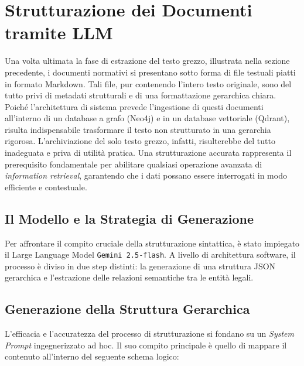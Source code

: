 \section{Strutturazione dei Documenti tramite LLM}
\label{sec:strutturazione_semantica}

Una volta ultimata la fase di estrazione del testo grezzo, illustrata nella sezione precedente, i documenti normativi si presentano sotto forma di file testuali piatti in formato Markdown. Tali file, pur contenendo l'intero testo originale, sono del tutto privi di metadati strutturali e di una formattazione gerarchica chiara. 
Poiché l'architettura di sistema prevede l'ingestione di questi documenti all'interno di un database a grafo (Neo4j) e in un database vettoriale (Qdrant), risulta indispensabile trasformare il testo non strutturato in una gerarchia rigorosa. L'archiviazione del solo testo grezzo, infatti, risulterebbe del tutto inadeguata e priva di utilità pratica. Una strutturazione accurata rappresenta il prerequisito fondamentale per abilitare qualsiasi operazione avanzata di \textit{information retrieval}, garantendo che i dati possano essere interrogati in modo efficiente e contestuale.

\subsection{Il Modello e la Strategia di Generazione}

Per affrontare il compito cruciale della strutturazione sintattica, è stato impiegato il Large Language Model \texttt{Gemini 2.5-flash}. A livello di architettura software, il processo è diviso in due step distinti: la generazione di una struttura JSON gerarchica e l'estrazione delle relazioni semantiche tra le entità legali.

\subsection{Generazione della Struttura Gerarchica}

L'efficacia e l'accuratezza del processo di strutturazione si fondano su un \textit{System Prompt} ingegnerizzato ad hoc. Il suo compito principale è quello di mappare il contenuto all'interno del seguente schema logico:

